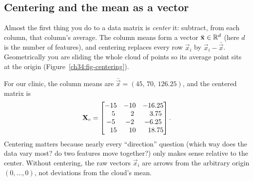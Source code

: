 \subsection{Centering and the mean as a vector}

Almost the first thing you do to a data matrix is \emph{center} it: subtract, from each
column, that column's average. The column means form a vector $\bar{\mathbf{x}} \in \mathbb{R}^{d}$
(here $d$ is the number of features), and centering replaces every row $\vec{x}_i$ by
$\vec{x}_i - \bar{\vec{x}}$. Geometrically you are sliding the whole cloud of points so
its average point sits at the origin (Figure~\ref{ch34:fig-centering}).

For our clinic, the column means are $\bar{\vec{x}} = (45,\,70,\,126.25)$, and the
centered matrix is
\[
\mathbf{X}_c =
\begin{bmatrix}
-15 & -10 & -16.25 \\
\phantom{-}5 & \phantom{-}2 & \phantom{-}3.75 \\
-5 & -2 & -6.25 \\
\phantom{-}15 & \phantom{-}10 & \phantom{-}18.75
\end{bmatrix}.
\]
Centering matters because nearly every ``direction'' question (which way does the data
vary most? do two features move together?) only makes sense relative to the center.
Without centering, the raw vectors $\vec{x}_i$ are arrows from the arbitrary origin
$(0,\dots,0)$, not deviations from the cloud's mean.

